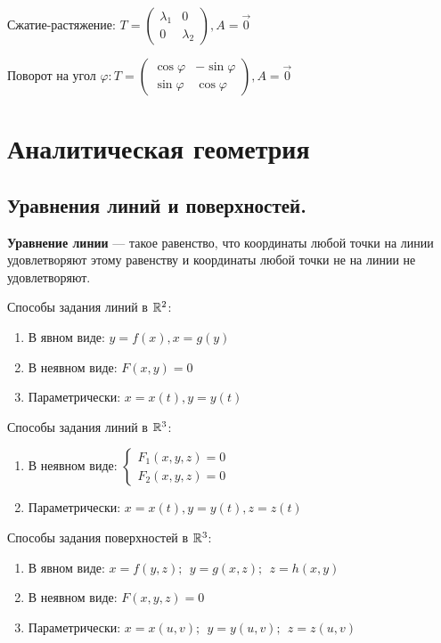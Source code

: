 Сжатие-растяжение: $T=\begin{pmatrix}
    \lambda_1 & 0 \\
    0 & \lambda_2
\end{pmatrix}, A=\vec 0$

Поворот на угол $\varphi: T=\begin{pmatrix}
    \cos\varphi & -\sin\varphi \\
    \sin\varphi & \cos\varphi
\end{pmatrix}, A=\vec 0$

\section{Аналитическая геометрия}

\subsection{Уравнения линий и поверхностей.}
\begin{definition}
    \textbf{Уравнение линии} --- такое равенство, что координаты любой точки на линии удовлетворяют этому равенству и координаты любой точки не на линии не удовлетворяют.
\end{definition}
Способы задания линий в $\mathbb{R}^2$:
\begin{enumerate}
    \item В явном виде: $y=f(x), x=g(y)$
    \item В неявном виде: $F(x,y)=0$
    \item Параметрически: $x=x(t), y=y(t)$
\end{enumerate}
Способы задания линий в $\mathbb{R}^3$:
\begin{enumerate}
    \item В неявном виде: $\begin{cases}F_1(x,y,z)=0 \\ F_2(x,y,z)=0\end{cases}$
    \item Параметрически: $x=x(t), y=y(t), z=z(t)$
\end{enumerate}
Способы задания поверхностей в $\mathbb{R}^3$:
\begin{enumerate}
    \item В явном виде: $x=f(y,z);\ \ y=g(x,z);\ \ z=h(x,y)$
    \item В неявном виде: $F(x,y,z)=0$
    \item Параметрически: $x=x(u,v);\ \ y=y(u,v);\ \ z=z(u,v)$
\end{enumerate}

